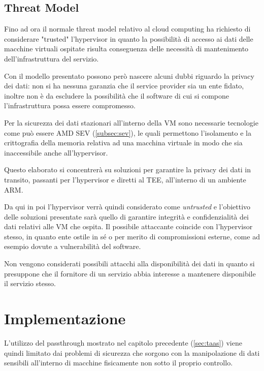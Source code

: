 \documentclass[12pt,italian]{report}
\begin{document}
	
	\newpage
	
	\section{Threat Model}
	\label{sec:threat_model}
	Fino ad ora il normale threat model relativo al cloud computing ha richiesto di considerare "trusted" l'hypervisor in quanto la possibilità di accesso ai dati delle macchine virtuali ospitate risulta conseguenza delle necessità di mantenimento dell'infrastruttura del servizio.
	
	Con il modello presentato possono però nascere alcuni dubbi riguardo la privacy dei dati: non si ha nessuna garanzia che il service provider sia un ente fidato, inoltre non è da escludere la possibilità che il software di cui si compone l'infrastruttura possa essere compromesso.
	
	\bigbreak
	
	Per la sicurezza dei dati stazionari all'interno della VM sono necessarie tecnologie come può essere AMD SEV (\ref{subsec:sev}), le quali permettono l'isolamento e la crittografia della memoria relativa ad una macchina virtuale in modo che sia inaccessibile anche all'hypervisor.
	
	Questo elaborato si concentrerà su soluzioni per garantire la privacy dei dati in transito, passanti per l'hypervisor e diretti al TEE, all'interno di un ambiente ARM. 
	
	\bigbreak
	
	Da qui in poi l'hypervisor verrà quindi considerato come \textit{untrusted} e l'obiettivo delle soluzioni presentate sarà quello di garantire integrità e confidenzialità dei dati relativi alle VM che ospita. Il possibile attaccante coincide con l'hypervisor stesso, in quanto ente ostile in sé o per merito di compromissioni esterne, come ad esempio dovute a vulnerabilità del software.
	
	Non vengono considerati possibili attacchi alla disponibilità dei dati in quanto si presuppone che il fornitore di un servizio abbia interesse a mantenere disponibile il servizio stesso.
	
	\chapter{Implementazione}
	\label{cap:implementazione}
	L'utilizzo del passthrough mostrato nel capitolo precedente (\ref{sec:taas}) viene quindi limitato dai problemi di sicurezza che sorgono con la manipolazione di dati sensibili all'interno di macchine fisicamente non sotto il proprio controllo.
	
\end{document}
